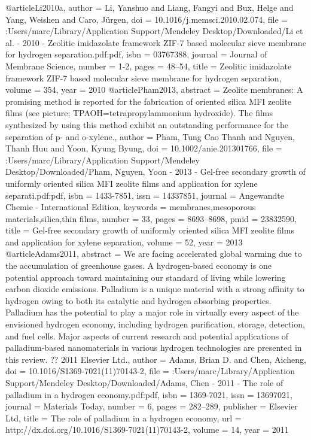 @article{Li2010a,
author = {Li, Yanshuo and Liang, Fangyi and Bux, Helge and Yang, Weishen and Caro, J{\"{u}}rgen},
doi = {10.1016/j.memsci.2010.02.074},
file = {:Users/marc/Library/Application Support/Mendeley Desktop/Downloaded/Li et al. - 2010 - Zeolitic imidazolate framework ZIF-7 based molecular sieve membrane for hydrogen separation.pdf:pdf},
isbn = {03767388},
journal = {Journal of Membrane Science},
number = {1-2},
pages = {48--54},
title = {{Zeolitic imidazolate framework ZIF-7 based molecular sieve membrane for hydrogen separation}},
volume = {354},
year = {2010}
}
@article{Pham2013,
abstract = {Zeolite membranes: A promising method is reported for the fabrication of oriented silica MFI zeolite films (see picture; TPAOH=tetrapropylammonium hydroxide). The films synthesized by using this method exhibit an outstanding performance for the separation of p- and o-xylene.},
author = {Pham, Tung Cao Thanh and Nguyen, Thanh Huu and Yoon, Kyung Byung},
doi = {10.1002/anie.201301766},
file = {:Users/marc/Library/Application Support/Mendeley Desktop/Downloaded/Pham, Nguyen, Yoon - 2013 - Gel-free secondary growth of uniformly oriented silica MFI zeolite films and application for xylene separati.pdf:pdf},
isbn = {1433-7851},
issn = {14337851},
journal = {Angewandte Chemie - International Edition},
keywords = {membranes,mesoporous materials,silica,thin films},
number = {33},
pages = {8693--8698},
pmid = {23832590},
title = {{Gel-free secondary growth of uniformly oriented silica MFI zeolite films and application for xylene separation}},
volume = {52},
year = {2013}
}
@article{Adams2011,
abstract = {We are facing accelerated global warming due to the accumulation of greenhouse gases. A hydrogen-based economy is one potential approach toward maintaining our standard of living while lowering carbon dioxide emissions. Palladium is a unique material with a strong affinity to hydrogen owing to both its catalytic and hydrogen absorbing properties. Palladium has the potential to play a major role in virtually every aspect of the envisioned hydrogen economy, including hydrogen purification, storage, detection, and fuel cells. Major aspects of current research and potential applications of palladium-based nanomaterials in various hydrogen technologies are presented in this review. ?? 2011 Elsevier Ltd.},
author = {Adams, Brian D. and Chen, Aicheng},
doi = {10.1016/S1369-7021(11)70143-2},
file = {:Users/marc/Library/Application Support/Mendeley Desktop/Downloaded/Adams, Chen - 2011 - The role of palladium in a hydrogen economy.pdf:pdf},
isbn = {1369-7021},
issn = {13697021},
journal = {Materials Today},
number = {6},
pages = {282--289},
publisher = {Elsevier Ltd},
title = {{The role of palladium in a hydrogen economy}},
url = {http://dx.doi.org/10.1016/S1369-7021(11)70143-2},
volume = {14},
year = {2011}
}
